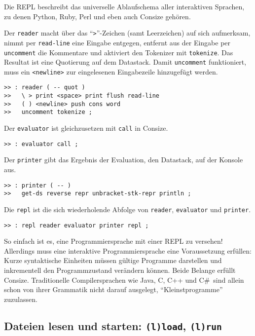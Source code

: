 Die REPL beschreibt das universelle Ablaufschema aller interaktiven Sprachen, zu denen Python, Ruby, Perl und eben auch Consize gehören.

Der \verb|reader| macht über das "`\verb|>|"'-Zeichen (samt Leerzeichen) auf sich aufmerksam, nimmt per \verb|read-line| eine Eingabe entgegen, entfernt aus der Eingabe per \verb|uncomment| die Kommentare und aktiviert den Tokenizer mit \verb|tokenize|. Das Resultat ist eine Quotierung auf dem Datastack. Damit \verb|uncomment| funktioniert, muss ein \verb|<newline>| zur eingelesenen Eingabezeile hinzugefügt werden.

\begin{verbatim}  
>> : reader ( -- quot )
>>   \ > print <space> print flush read-line
>>   ( ) <newline> push cons word
>>   uncomment tokenize ;
\end{verbatim}

Der \verb|evaluator| ist gleichzusetzen mit \verb|call| in Consize. 

\begin{verbatim}  
>> : evaluator call ;
\end{verbatim}

Der \verb|printer| gibt das Ergebnis der Evaluation, den Datastack, auf der Konsole aus.

\begin{verbatim}
>> : printer ( -- )
>>   get-ds reverse repr unbracket-stk-repr println ;
\end{verbatim}

Die \verb|repl| ist die sich wiederholende Abfolge von \verb|reader|, \verb|evaluator| und \verb|printer|.

\begin{verbatim}  
>> : repl reader evaluator printer repl ;
\end{verbatim}

So einfach ist es, eine Programmiersprache mit einer REPL zu versehen! Allerdings muss eine interaktive Programmiersprache eine Voraussetzung erfüllen: Kurze syntaktische Einheiten müssen gültige Programme darstellen und inkrementell den Programmzustand verändern können. 
Beide Belange erfüllt Consize. Traditionelle Compilersprachen wie Java, C, C++ und C\#\ sind allein schon von ihrer Grammatik nicht darauf ausgelegt, "`Kleinstprogramme"' zuzulassen.

\subsection{Dateien lesen und starten: \texttt{(l)load}, \texttt{(l)run}}
\label{Sec:Dateien}

